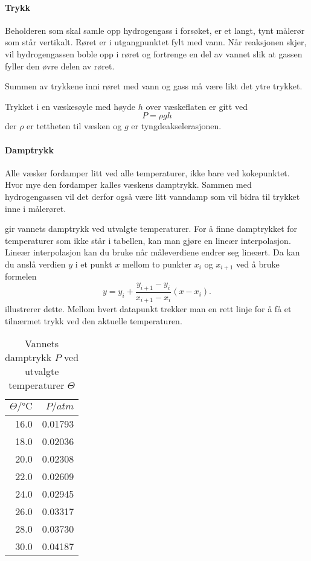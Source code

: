 	\paragraph{Trykk}
	Beholderen som skal samle opp hydrogengass i forsøket, er et langt, tynt målerør som står vertikalt. Røret er i utgangpunktet fylt med vann. Når reaksjonen skjer, vil hydrogengassen boble opp i røret og fortrenge en del av vannet slik at gassen fyller den øvre delen av røret. 
	
	Summen av trykkene inni røret med vann og gass må være likt det ytre trykket. 
	
	Trykket i en væskesøyle med høyde $h$ over væskeflaten er gitt ved 
	\begin{equation}
		P=\rho gh \label{eq:rgh}
	\end{equation}
	der $\rho$ er tettheten til væsken og $g$ er tyngdeakselerasjonen.
	
	\paragraph{Damptrykk}
	Alle væsker fordamper litt ved alle temperaturer, ikke bare ved kokepunktet. Hvor mye den fordamper kalles væskens damptrykk. Sammen med hydrogengassen vil det derfor også være litt vanndamp som vil bidra til trykket inne i målerøret.
	
	 gir vannets damptrykk ved utvalgte temperaturer. For å finne damptrykket for temperaturer som ikke står i tabellen, kan man gjøre en lineær interpolasjon. Lineær interpolasjon kan du bruke når måleverdiene endrer seg lineært. Da kan du anslå verdien $y$ i et punkt $x$ mellom to punkter $x_i$ og $x_{i+1}$  ved å bruke formelen
	\begin{equation}
		y = y_i + \frac{y_{i+1} - y_i}{x_{i+1} - x_i}(x-x_i). \label{eq:inter}
	\end{equation}
	 illustrerer dette. Mellom hvert datapunkt trekker man en rett linje for å få et tilnærmet trykk ved den aktuelle temperaturen.
	
	\begin{table}[H]
		\centering
		\caption{Vannets damptrykk $P$ ved utvalgte temperaturer $\Theta$}
		\label{tbl:vap}
		\begin{tabular}{rr}
			\toprule
			$\Theta/\si{\degreeCelsius}$ & $P/\si{atm}$ \\
			\midrule
			16.0 & 0.01793 \\
			18.0 & 0.02036 \\
			20.0 & 0.02308 \\
			22.0 & 0.02609 \\
			24.0 & 0.02945 \\
			26.0 & 0.03317 \\
			28.0 & 0.03730 \\
			30.0 & 0.04187 \\ \bottomrule
		\end{tabular}
	\end{table}

